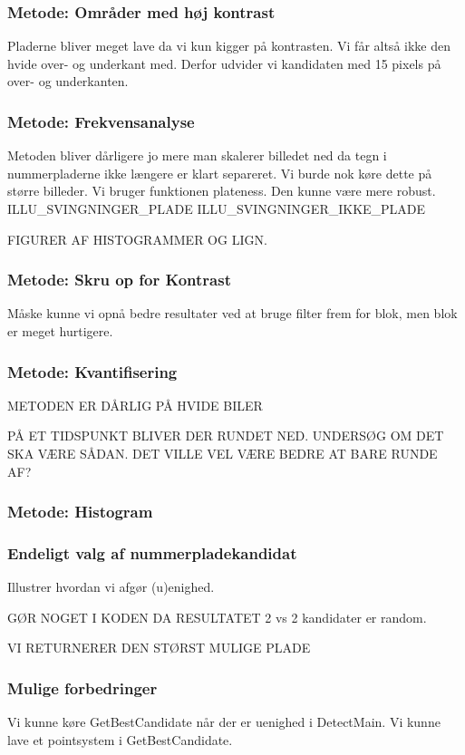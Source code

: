 \subsubsection{Metode: Områder med høj kontrast}
Pladerne bliver meget lave da vi kun kigger på kontrasten. Vi får altså ikke den hvide over- og underkant med. Derfor udvider vi kandidaten med 15 pixels på over- og underkanten. 

\subsubsection{Metode: Frekvensanalyse}
Metoden bliver dårligere jo mere man skalerer billedet ned da tegn i nummerpladerne ikke længere er klart separeret. Vi burde nok køre dette på større billeder.
Vi bruger funktionen plateness. Den kunne være mere robust.
ILLU\_SVINGNINGER\_PLADE ILLU\_SVINGNINGER\_IKKE\_PLADE

FIGURER AF HISTOGRAMMER OG LIGN.


\subsubsection{Metode: Skru op for Kontrast}
Måske kunne vi opnå bedre resultater ved at bruge filter frem for blok, men blok er meget hurtigere.

\subsubsection{Metode: Kvantifisering}

METODEN ER DÅRLIG PÅ HVIDE BILER

PÅ ET TIDSPUNKT BLIVER DER RUNDET NED. UNDERSØG OM DET SKA VÆRE SÅDAN. DET VILLE VEL VÆRE BEDRE AT BARE RUNDE AF?


\subsubsection{Metode: Histogram}

\subsubsection{Endeligt valg af nummerpladekandidat}
Illustrer hvordan vi afgør (u)enighed. 

GØR NOGET I KODEN DA RESULTATET 2 vs 2 kandidater er random.

VI RETURNERER DEN STØRST MULIGE PLADE

\subsubsection{Mulige forbedringer}
Vi kunne køre GetBestCandidate når der er uenighed i DetectMain.
Vi kunne lave et pointsystem i GetBestCandidate.

